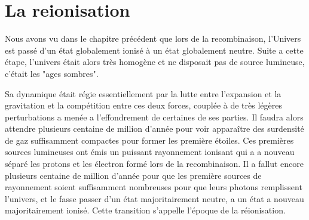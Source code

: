 \chapter{La reionisation} 
\label{sec:introreio}
%
%
%
%

Nous avons vu dans le chapitre précédent que lors de la recombinaison, l'Univers est passé d'un état globalement ionisé à un état globalement neutre.
Suite a cette étape, l'univers était alors très homogène et ne disposait pas de source lumineuse, c'était les "ages sombres".

Sa dynamique était régie essentiellement par la lutte entre l'expansion et la gravitation et la compétition entre ces deux forces, couplée à de très légères perturbations a menée a l'effondrement de certaines de ses parties.
Il faudra alors attendre plusieurs centaine de million d'année pour voir apparaître des surdensité de gaz suffisamment compactes pour former les première étoiles.
Ces premières sources lumineuses ont émis un puissant rayonnement ionisant qui a a nouveau séparé les protons et les électron formé lors de la recombinaison.
Il a fallut encore plusieurs centaine de million d'année pour que les première sources de rayonnement soient suffisamment nombreuses pour que leurs photons remplissent l'univers, et le fasse passer d'un état majoritairement neutre, a un état a nouveau majoritairement ionisé.
Cette transition s'appelle l’époque de la réionisation.





